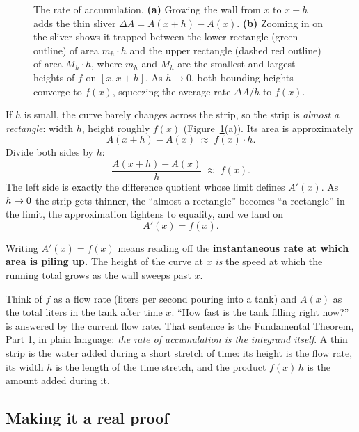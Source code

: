 \begin{figure}[H]
\caption{The rate of accumulation. \textbf{(a)} Growing the wall from $x$ to $x+h$ adds the thin sliver $\Delta A = A(x+h)-A(x)$. \textbf{(b)} Zooming in on the sliver shows it trapped between the lower rectangle (green outline) of area $m_h \cdot h$ and the upper rectangle (dashed red outline) of area $M_h \cdot h$, where $m_h$ and $M_h$ are the smallest and largest heights of $f$ on $[x,x+h]$. As $h \to 0$, both bounding heights converge to $f(x)$, squeezing the average rate $\Delta A / h$ to $f(x)$.}
\label{ch21:fig-strip}
\end{figure}

If $h$ is small, the curve barely changes across the strip, so the strip is
\emph{almost a rectangle}: width $h$, height roughly $f(x)$
(Figure~\ref{ch21:fig-strip}(a)). Its area is approximately
\[
  A(x+h)-A(x) \;\approx\; f(x)\cdot h .
\]
Divide both sides by $h$:
\[
  \frac{A(x+h)-A(x)}{h} \;\approx\; f(x).
\]
The left side is exactly the difference quotient whose limit defines $A'(x)$. As
$h\to 0$ the strip gets thinner, the ``almost a rectangle'' becomes ``a
rectangle'' in the limit, the approximation tightens to equality, and we land on
\[
  A'(x) = f(x).
\]

\begin{happeningbox}
Writing $A'(x)=f(x)$ means reading off the
\textbf{instantaneous rate at which area is piling up.} The height of the curve
at $x$ \emph{is} the speed at which the running total grows as the wall
sweeps past $x$.

Think of $f$ as a flow rate (liters per second pouring into a tank) and
$A(x)$ as the total liters in the tank after time $x$. ``How fast is the tank
filling right now?'' is answered by the current flow rate. That sentence is the
Fundamental Theorem, Part 1, in plain language: \emph{the rate of accumulation is
the integrand itself}. A thin strip is the water added during a short stretch of
time: its height is the flow rate, its width $h$ is the length of the time
stretch, and the product $f(x)\,h$ is the amount added during it.
\end{happeningbox}

\subsection{Making it a real proof}

